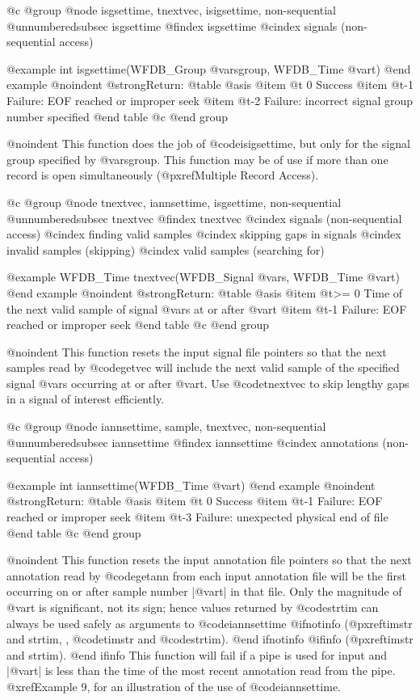 {{{{{{{{@c @group
@node     isgsettime, tnextvec, isigsettime, non-sequential
@unnumberedsubsec isgsettime
@findex isgsettime
@cindex signals (non-sequential access)

@example
int isgsettime(WFDB_Group @var{sgroup}, WFDB_Time @var{t})
@end example
@noindent
@strong{Return:}
@table @asis
@item @t{ 0}
Success
@item @t{-1}
Failure: EOF reached or improper seek
@item @t{-2}
Failure: incorrect signal group number specified
@end table
@c @end group

@noindent
This function does the job of @code{isigsettime}, but only for the signal
group specified by @var{sgroup}.  This function may be of use if more than
one record is open simultaneously (@pxref{Multiple Record Access}).

@c @group
@node     tnextvec, iannsettime, isgsettime, non-sequential
@unnumberedsubsec tnextvec
@findex tnextvec
@cindex signals (non-sequential access)
@cindex finding valid samples
@cindex skipping gaps in signals
@cindex invalid samples (skipping)
@cindex valid samples (searching for)

@example
WFDB_Time tnextvec(WFDB_Signal @var{s}, WFDB_Time @var{t})
@end example
@noindent
@strong{Return:}
@table @asis
@item @t{>= 0}
Time of the next valid sample of signal @var{s} at or after @var{t}
@item @t{-1}
Failure: EOF reached or improper seek
@end table
@c @end group

@noindent
This function resets the input signal file pointers so that the next
samples read by @code{getvec} will include the next valid sample of
the specified signal @var{s} occurring at or after @var{t}.  Use
@code{tnextvec} to skip lengthy gaps in a signal of interest
efficiently.

@c @group
@node     iannsettime, sample, tnextvec, non-sequential
@unnumberedsubsec iannsettime
@findex iannsettime
@cindex annotations (non-sequential access)

@example
int iannsettime(WFDB_Time @var{t})
@end example
@noindent
@strong{Return:}
@table @asis
@item @t{ 0}
Success
@item @t{-1}
Failure: EOF reached or improper seek
@item @t{-3}
Failure: unexpected physical end of file
@end table
@c @end group

@noindent
This function resets the input annotation file pointers so that the next
annotation read by @code{getann} from each input annotation file will be
the first occurring on or after sample number |@var{t}| in that file.
Only the magnitude of @var{t} is significant, not its sign; hence values
returned by @code{strtim} can always be used safely as arguments to
@code{iannsettime}
@ifnotinfo
(@pxref{timstr and strtim, , @code{timstr} and @code{strtim}}).
@end ifnotinfo
@ifinfo
(@pxref{timstr and strtim}).
@end ifinfo
This function will fail if a pipe is used for input and |@var{t}| is less
than the time of the most recent annotation read from the pipe.
@xref{Example 9}, for an illustration of the use of @code{iannsettime}.

}}}}}}}}
